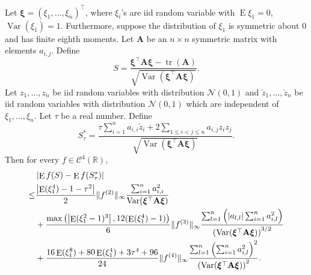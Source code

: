 \documentclass[smallextended]{svjour3}       %
\DeclareMathOperator{\mytr}{tr}
\DeclareMathOperator{\myE}{E}
\DeclareMathOperator{\myVar}{Var}
\newcommand{\BA}{\mathbf{A}}    \newcommand{\BB}{\mathbf{B}}    \newcommand{\BC}{\mathbf{C}}    \newcommand{\BD}{\mathbf{D}}    \newcommand{\BE}{\mathbf{E}}    \newcommand{\BF}{\mathbf{F}}    \newcommand{\BG}{\mathbf{G}}    \newcommand{\BH}{\mathbf{H}}    \newcommand{\BI}{\mathbf{I}}    \newcommand{\BJ}{\mathbf{J}}    \newcommand{\BK}{\mathbf{K}}    \newcommand{\BL}{\mathbf{L}}
\newcommand{\bfsym}[1]{\ensuremath{\boldsymbol{#1}}}
\def\bxi{\bfsym {\xi}}
\begin{document}
\begin{theorem}\label{TheoremLindeberg}

    Let $\bxi=(\xi_1,\ldots,\xi_n)^\top$, where $\xi_i$'s are iid random variable with $\myE \xi_1=0$, $\myVar (\xi_1)=1$.
    Furthermore, suppose the distribution of  $\xi_1$ is symmetric about $0$ and has finite eighth moments.
    Let $\BA$ be an $n\times n$ symmetric matrix with elements $a_{i,j}$.
Define
    \begin{equation*}
        S=\frac{
            \bxi^\top \BA \bxi-\mytr (\BA)
        }{
            \sqrt{
                \myVar(\bxi^\top \BA \bxi)
            }             
        }.
    \end{equation*}
    Let $z_1,\ldots,z_n$  be iid random variables with distribution $\mathcal N (0, 1) $ and $\check z_1, \ldots, \check z_n$ be iid random variables with distribution $\mathcal N (0,1)$ which are independent of $\xi_1,\ldots, \xi_n$.
    Let $\tau$ be a real number.
    Define
    \begin{equation*}
        S_\tau^* =
        \frac{
            \tau \sum_{i=1}^n  a_{i,i}\check z_i
        +2\sum_{1\leq i <j \leq n} a_{i,j} z_i z_j
    }
    {
            \sqrt{
                \myVar(\bxi^\top \BA \bxi)
            }             
        }.
    \end{equation*}
    Then for every $f\in \mathscr C^4(\mathbb R)$,
    \begin{equation}\label{eq:longInequality}
        \begin{split}
             &
              \left| \myE f(S)-\myE f(S_\tau^*)\right|
             \\
\leq&
\frac{
\left|
\myE (\xi_1^4)-1
            -
            \tau^2
\right|
}{2}
\|f^{(2)}\|_\infty
\frac{
    \sum_{i=1}^n a_{i,i}^2
}{
                \myVar(\bxi^\top \BA \bxi)
}
\\
&
            +
            \frac{
            \max\left(
    \left|\myE (\xi_1^2-1)^3\right|
            ,
12 (\myE (\xi_1^4)-1)
        \right)
            }{6} \|f^{(3)}\|_\infty
            \frac{
            \sum_{l=1}^n 
            \left(|a_{l,l}|
         \sum_{i=1}^{n} a_{i,l}^2 
     \right)
 }{
    \left(
                \myVar(\bxi^\top \BA \bxi)
\right)^{3/2}
 }
         \\
            &+
            \frac{
             16 \myE (\xi_1^8) + 80 \myE (\xi_1^4) + 3\tau^4 + 96 
            }{24} \|f^{(4)} \|_{\infty} 
            \frac{
                \sum_{l=1}^n \left( \sum_{i=1}^n a_{i,l}^2 \right)^2
            }{
            \left(
                \myVar(\bxi^\top \BA \bxi)
\right)^{2}
            }
            .
        \end{split}
    \end{equation}
    \label{approximation}
\end{theorem}
\end{document}
